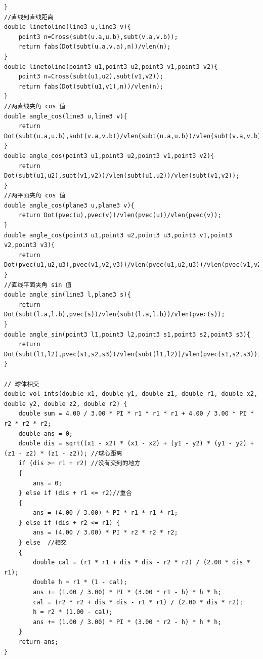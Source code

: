 \documentclass[twoside]{article}
\begin{document}
\begin{lstlisting}
}
//直线到直线距离 
double linetoline(line3 u,line3 v){
    point3 n=Cross(subt(u.a,u.b),subt(v.a,v.b));
    return fabs(Dot(subt(u.a,v.a),n))/vlen(n);
}
double linetoline(point3 u1,point3 u2,point3 v1,point3 v2){
    point3 n=Cross(subt(u1,u2),subt(v1,v2));
    return fabs(Dot(subt(u1,v1),n))/vlen(n);
}
//两直线夹角 cos 值 
double angle_cos(line3 u,line3 v){
    return Dot(subt(u.a,u.b),subt(v.a,v.b))/vlen(subt(u.a,u.b))/vlen(subt(v.a,v.b));
}
double angle_cos(point3 u1,point3 u2,point3 v1,point3 v2){
    return Dot(subt(u1,u2),subt(v1,v2))/vlen(subt(u1,u2))/vlen(subt(v1,v2));
}
//两平面夹角 cos 值 
double angle_cos(plane3 u,plane3 v){
    return Dot(pvec(u),pvec(v))/vlen(pvec(u))/vlen(pvec(v));
}
double angle_cos(point3 u1,point3 u2,point3 u3,point3 v1,point3 v2,point3 v3){
    return Dot(pvec(u1,u2,u3),pvec(v1,v2,v3))/vlen(pvec(u1,u2,u3))/vlen(pvec(v1,v2,v3));
}
//直线平面夹角 sin 值 
double angle_sin(line3 l,plane3 s){
    return Dot(subt(l.a,l.b),pvec(s))/vlen(subt(l.a,l.b))/vlen(pvec(s));
}
double angle_sin(point3 l1,point3 l2,point3 s1,point3 s2,point3 s3){
    return Dot(subt(l1,l2),pvec(s1,s2,s3))/vlen(subt(l1,l2))/vlen(pvec(s1,s2,s3));
} 

// 球体相交
double vol_ints(double x1, double y1, double z1, double r1, double x2, double y2, double z2, double r2) {
    double sum = 4.00 / 3.00 * PI * r1 * r1 * r1 + 4.00 / 3.00 * PI * r2 * r2 * r2;
    double ans = 0;
    double dis = sqrt((x1 - x2) * (x1 - x2) + (y1 - y2) * (y1 - y2) + (z1 - z2) * (z1 - z2)); //球心距离
    if (dis >= r1 + r2) //没有交到的地方
    {
        ans = 0;
    } else if (dis + r1 <= r2)//重合
    {
        ans = (4.00 / 3.00) * PI * r1 * r1 * r1;
    } else if (dis + r2 <= r1) {
        ans = (4.00 / 3.00) * PI * r2 * r2 * r2;
    } else  //相交
    {
        double cal = (r1 * r1 + dis * dis - r2 * r2) / (2.00 * dis * r1);
        double h = r1 * (1 - cal);
        ans += (1.00 / 3.00) * PI * (3.00 * r1 - h) * h * h;
        cal = (r2 * r2 + dis * dis - r1 * r1) / (2.00 * dis * r2);
        h = r2 * (1.00 - cal);
        ans += (1.00 / 3.00) * PI * (3.00 * r2 - h) * h * h;
    }
    return ans;
}\end{lstlisting}
\end{document}
